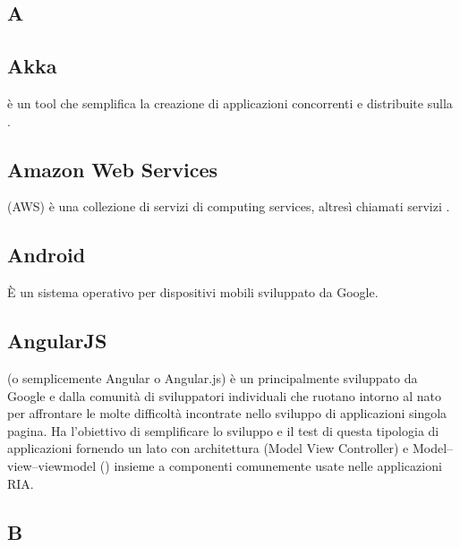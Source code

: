 \newpage

\begin{center}
\Huge\section*{\uppercase{A}}
\end{center}

\subsection*{Akka}
 è un tool  che semplifica la creazione di applicazioni concorrenti e distribuite sulla .

\subsection*{Amazon Web Services}
 (AWS) è una collezione di servizi di  computing services, altresì chiamati servizi .

\subsection*{Android}
È un sistema operativo  per dispositivi mobili sviluppato da Google.

\subsection*{AngularJS}
 (o semplicemente Angular o Angular.js) è un    principalmente sviluppato da Google e dalla comunità di sviluppatori individuali che ruotano intorno al  nato per affrontare le molte difficoltà incontrate nello sviluppo di applicazioni singola pagina. Ha l'obiettivo di semplificare lo sviluppo e il test di questa tipologia di applicazioni fornendo un  lato  con architettura  (Model View Controller) e Model–view–viewmodel () insieme a componenti comunemente usate nelle applicazioni RIA.

\newpage

\begin{center}
\Huge\section*{\uppercase{B}}
\end{center}

